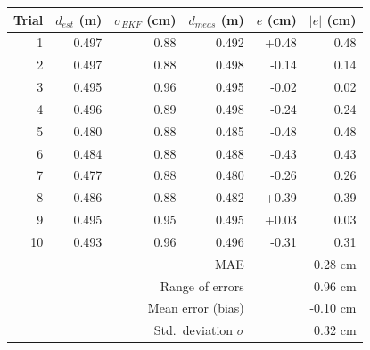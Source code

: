 \begin{tabular}{rrrrrr}
\hline
Trial & $d_{est}$ (m) & $\sigma_{EKF}$ (cm) & $d_{meas}$ (m) & $e$ (cm) & $|e|$ (cm) \\
\hline
1 & 0.497 & 0.88 & 0.492 & +0.48 & 0.48 \\
2 & 0.497 & 0.88 & 0.498 & -0.14 & 0.14 \\
3 & 0.495 & 0.96 & 0.495 & -0.02 & 0.02 \\
4 & 0.496 & 0.89 & 0.498 & -0.24 & 0.24 \\
5 & 0.480 & 0.88 & 0.485 & -0.48 & 0.48 \\
6 & 0.484 & 0.88 & 0.488 & -0.43 & 0.43 \\
7 & 0.477 & 0.88 & 0.480 & -0.26 & 0.26 \\
8 & 0.486 & 0.88 & 0.482 & +0.39 & 0.39 \\
9 & 0.495 & 0.95 & 0.495 & +0.03 & 0.03 \\
10 & 0.493 & 0.96 & 0.496 & -0.31 & 0.31 \\
\hline
\multicolumn{4}{r}{MAE} & \multicolumn{2}{r}{0.28 cm} \\
\multicolumn{4}{r}{Range of errors} & \multicolumn{2}{r}{0.96 cm} \\
\multicolumn{4}{r}{Mean error (bias)} & \multicolumn{2}{r}{-0.10 cm} \\
\multicolumn{4}{r}{Std.\ deviation $\sigma$} & \multicolumn{2}{r}{0.32 cm} \\
\hline
\end{tabular}
